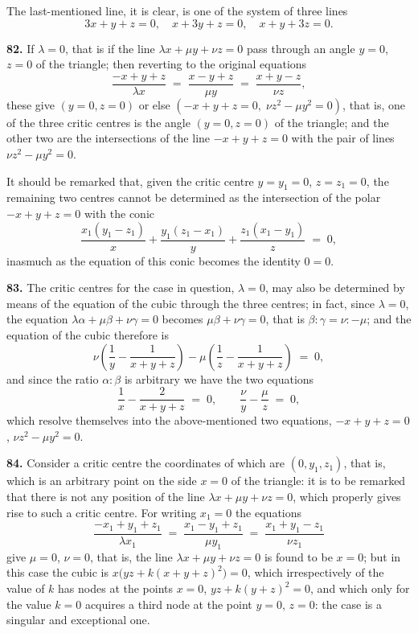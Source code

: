 \documentclass[11pt,a4paper]{article}
\begin{document}
The last-mentioned line, it is clear, is one of the system of three lines
\[
3x+y+z=0,\quad x+3y+z=0,\quad x+y+3z=0.
\]

\medskip

\textbf{82.} If $\lambda = 0$, that is if the line $\lambda x + \mu y + \nu z = 0$ pass through an angle $y=0$, $z=0$ of the triangle; then reverting to the original equations
\[
\frac{-x+y+z}{\lambda x} \;=\; \frac{x-y+z}{\mu y} \;=\; \frac{x+y-z}{\nu z},
\]
these give $(y=0,z=0)$ or else $(-x+y+z=0,\;\nu z^{2}-\mu y^{2}=0)$, that is, one of the three critic centres is the angle $(y=0,z=0)$ of the triangle; and the other two are the intersections of the line $-x+y+z=0$ with the pair of lines $\nu z^{2}-\mu y^{2}=0$.

It should be remarked that, given the critic centre $y=y_{1}=0$, $z=z_{1}=0$, the remaining two centres cannot be determined as the intersection of the polar $-x+y+z=0$ with the conic
\[
\frac{x_{1}(y_{1}-z_{1})}{x} + \frac{y_{1}(z_{1}-x_{1})}{y} + \frac{z_{1}(x_{1}-y_{1})}{z} \;=\; 0,
\]
inasmuch as the equation of this conic becomes the identity $0=0$.

\medskip

\textbf{83.} The critic centres for the case in question, $\lambda = 0$, may also be determined by means of the equation of the cubic through the three centres; in fact, since $\lambda = 0$, the equation $\lambda\alpha + \mu\beta + \nu\gamma = 0$ becomes $\mu\beta + \nu\gamma = 0$, that is $\beta:\gamma = \nu:-\mu$; and the equation of the cubic therefore is
\[
\nu\!\left(\frac{1}{y}-\frac{1}{x+y+z}\right) - \mu\!\left(\frac{1}{z}-\frac{1}{x+y+z}\right) \;=\; 0,
\]
and since the ratio $\alpha:\beta$ is arbitrary we have the two equations
\[
\frac{1}{x}-\frac{2}{x+y+z} \;=\; 0,\qquad \frac{\nu}{y}-\frac{\mu}{z} \;=\; 0,
\]
which resolve themselves into the above-mentioned two equations, $-x+y+z=0$, $\nu z^{2}-\mu y^{2}=0$.

\medskip

\textbf{84.} Consider a critic centre the coordinates of which are $(0,y_{1},z_{1})$, that is, which is an arbitrary point on the side $x=0$ of the triangle: it is to be remarked that there is not any position of the line $\lambda x + \mu y + \nu z = 0$, which properly gives rise to such a critic centre. For writing $x_{1}=0$ the equations
\[
\frac{-x_{1}+y_{1}+z_{1}}{\lambda x_{1}} \;=\; \frac{x_{1}-y_{1}+z_{1}}{\mu y_{1}} \;=\; \frac{x_{1}+y_{1}-z_{1}}{\nu z_{1}}
\]
give $\mu = 0$, $\nu = 0$, that is, the line $\lambda x + \mu y + \nu z = 0$ is found to be $x = 0$; but in this case the cubic is $x\bigl(yz + k(x+y+z)^{2}\bigr)=0$, which irrespectively of the value of $k$ has nodes at the points $x=0$, $yz + k(y+z)^{2}=0$, and which only for the value $k=0$ acquires a third node at the point $y=0$, $z=0$: the case is a singular and exceptional one.
\end{document}
